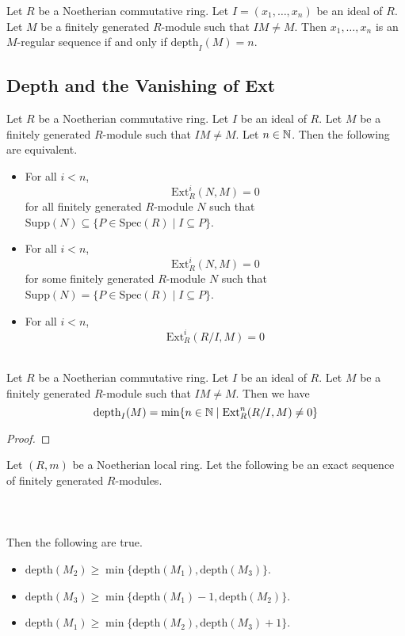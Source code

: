 \documentclass[a4paper]{article}
\begin{document}
\begin{crl}{}{} Let $R$ be a Noetherian commutative ring. Let $I=(x_1,\dots,x_n)$ be an ideal of $R$. Let $M$ be a finitely generated $R$-module such that $IM\neq M$. Then $x_1,\dots,x_n$ is an $M$-regular sequence if and only if $\text{depth}_I(M)=n$. 
\end{crl}

\subsection{Depth and the Vanishing of Ext}
\begin{prp}{}{} Let $R$ be a Noetherian commutative ring. Let $I$ be an ideal of $R$. Let $M$ be a finitely generated $R$-module such that $IM\neq M$. Let $n\in\mathbb{N}$. Then the following are equivalent. 
\begin{itemize}
\item For all $i<n$, $$\text{Ext}_R^i(N,M)=0$$ for all finitely generated $R$-module $N$ such that $\text{Supp}(N)\subseteq\{P\in\text{Spec}(R)\;|\;I\subseteq P\}$. 
\item For all $i<n$, $$\text{Ext}_R^i(N,M)=0$$ for some finitely generated $R$-module $N$ such that $\text{Supp}(N)=\{P\in\text{Spec}(R)\;|\;I\subseteq P\}$. 
\item For all $i<n$, $$\text{Ext}_R^i\left(R/I,M\right)=0$$
\end{itemize}
\end{prp}

\begin{prp}{}{}\\
Let $R$ be a Noetherian commutative ring. Let $I$ be an ideal of $R$. Let $M$ be a finitely generated $R$-module such that $IM\neq M$. Then we have $$\text{depth}_I(M)=\min\{n\in\mathbb{N}\;|\;\text{Ext}_R^n(R/I,M)\neq 0\}$$
\begin{proof}
\end{proof}
\end{prp}

\begin{lmm}{}{} Let $(R,m)$ be a Noetherian local ring. Let the following be an exact sequence of finitely generated $R$-modules. \\~\\
\\~\\
Then the following are true. 
\begin{itemize}
\item $\text{depth}(M_2)\geq\min\{\text{depth}(M_1),\text{depth}(M_3)\}$. 
\item $\text{depth}(M_3)\geq\min\{\text{depth}(M_1)-1,\text{depth}(M_2)\}$. 
\item $\text{depth}(M_1)\geq\min\{\text{depth}(M_2),\text{depth}(M_3)+1\}$. 
\end{itemize}
\end{lmm}
\end{document}
